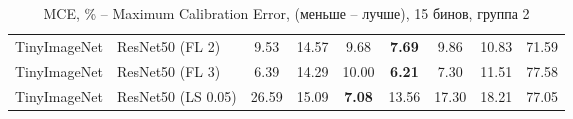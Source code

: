 \begin{table}[h!]
{\begin{tabular}{llccccccc}
TinyImageNet &             ResNet50 (FL 2) &                   9.53 &        14.57 &                   9.68 &  \textbf{7.69} &                   9.86 &                  10.83 &                  71.59 \\
TinyImageNet &             ResNet50 (FL 3) &                   6.39 &        14.29 &                  10.00 &  \textbf{6.21} &                   7.30 &                  11.51 &                  77.58 \\
TinyImageNet &          ResNet50 (LS 0.05) &                  26.59 &        15.09 &  \textbf{7.08} &                  13.56 &                  17.30 &                  18.21 &                  77.05 \\
\bottomrule
\end{tabular}%
}
\caption{MCE, \% -- Maximum Calibration Error, (меньше -- лучше), 15 бинов, группа 2}
\label{tab:metrics:MCE_2}
\end{table}
